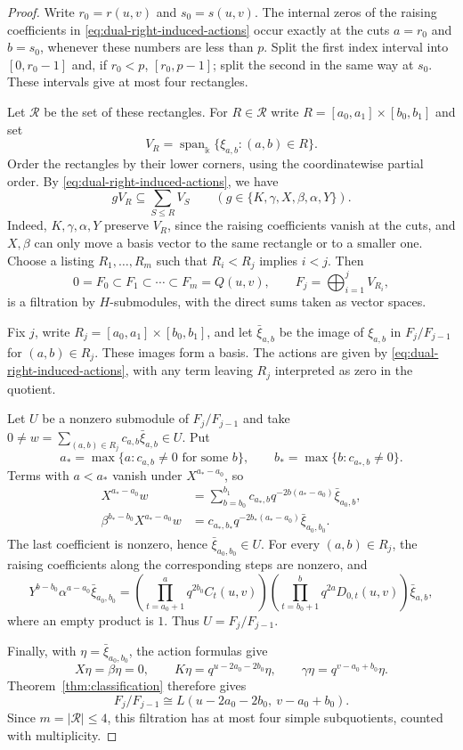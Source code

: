 \documentclass[10pt,oneside]{amsart}
\newcommand{\kk}{\Bbbk}
\theoremstyle{definition}
\begin{document}
\begin{proof}
Write $r_0=r(u,v)$ and $s_0=s(u,v)$. The internal zeros of the
raising coefficients in \eqref{eq:dual-right-induced-actions}
occur exactly at the cuts $a=r_0$ and $b=s_0$, whenever these
numbers are less than $p$. Split the first index interval into
$[0,r_0-1]$ and, if $r_0<p$, $[r_0,p-1]$; split the second in
the same way at $s_0$. These intervals give at most four
rectangles.

Let \(\mathcal R\) be the set of these rectangles. For \(R\in\mathcal R\)
write \(R=[a_0,a_1]\times[b_0,b_1]\) and set
\[
 V_R=\operatorname{span}_{\kk}\{\xi_{a,b}:(a,b)\in R\}.
\]
Order the rectangles by their lower corners, using the coordinatewise
partial order. By \eqref{eq:dual-right-induced-actions}, we have
\[
 gV_R\subseteq\sum_{S\le R}V_S
 \qquad(g\in\{K,\gamma,X,\beta,\alpha,Y\}).
\]
Indeed, \(K,\gamma,\alpha,Y\) preserve \(V_R\), since the raising
coefficients vanish at the cuts, and \(X,\beta\) can only move a basis
vector to the same rectangle or to a smaller one. Choose a listing
\(R_1,\ldots,R_m\) such that \(R_i<R_j\) implies \(i<j\). Then
\[
 0=F_0\subset F_1\subset\cdots\subset F_m=Q(u,v),
 \qquad F_j=\bigoplus_{i=1}^{j}V_{R_i},
\]
is a filtration by \(H\)-submodules, with the direct sums taken as vector spaces.

Fix \(j\), write \(R_j=[a_0,a_1]\times[b_0,b_1]\), and let
\(\bar\xi_{a,b}\) be the image of \(\xi_{a,b}\) in \(F_j/F_{j-1}\)
for \((a,b)\in R_j\). These images form a basis. The actions are
given by \eqref{eq:dual-right-induced-actions}, with any term leaving
\(R_j\) interpreted as zero in the quotient.

Let \(U\) be a nonzero submodule of \(F_j/F_{j-1}\) and take
\(0\ne w=\sum_{(a,b)\in R_j}c_{a,b}\bar\xi_{a,b}\in U\).
Put
\[
 a_*=\max\{a:c_{a,b}\ne0\text{ for some }b\},
 \qquad b_*=\max\{b:c_{a_*,b}\ne0\}.
\]
Terms with \(a<a_*\) vanish under \(X^{a_*-a_0}\), so
\begin{align*}
 X^{a_*-a_0}w
 &=\sum_{b=b_0}^{b_1}c_{a_*,b}q^{-2b(a_*-a_0)}\bar\xi_{a_0,b},\\
 \beta^{b_*-b_0}X^{a_*-a_0}w
 &=c_{a_*,b_*}q^{-2b_*(a_*-a_0)}\bar\xi_{a_0,b_0}.
\end{align*}
The last coefficient is nonzero, hence \(\bar\xi_{a_0,b_0}\in U\).
For every \((a,b)\in R_j\), the raising coefficients along the
corresponding steps are nonzero, and
\[
 Y^{b-b_0}\alpha^{a-a_0}\bar\xi_{a_0,b_0}
 =
 \left(\prod_{t=a_0+1}^{a}q^{2b_0}C_t(u,v)\right)
 \left(\prod_{t=b_0+1}^{b}q^{2a}D_{0,t}(u,v)\right)
 \bar\xi_{a,b},
\]
where an empty product is \(1\). Thus \(U=F_j/F_{j-1}\).

Finally, with \(\eta=\bar\xi_{a_0,b_0}\), the action formulas give
\[
 X\eta=\beta\eta=0,\qquad
 K\eta=q^{u-2a_0-2b_0}\eta,\qquad
 \gamma\eta=q^{v-a_0+b_0}\eta.
\]
Theorem~\ref{thm:classification} therefore gives
\[
 F_j/F_{j-1}\cong L(u-2a_0-2b_0,\ v-a_0+b_0).
\]
Since \(m=|\mathcal R|\le4\), this filtration has at most four
simple subquotients, counted with multiplicity.

\end{proof}
\end{document}
